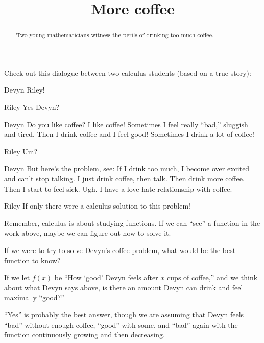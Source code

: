 \documentclass{ximera}
\title[Break-Ground:]{More coffee}
\begin{document}
\begin{abstract}
Two young mathematicians witness the perils of drinking too much
coffee.
\end{abstract}
\maketitle

Check out this dialogue between two calculus students (based on a true
story):

\begin{dialogue}
\item[Devyn] Riley! 
\item[Riley] Yes Devyn?
\item[Devyn] Do you like coffee? I like coffee! Sometimes I feel
  really ``bad,'' sluggish and tired. Then I drink coffee and I feel
  good! Sometimes I drink a lot of coffee!
\item[Riley] Um?
\item[Devyn] But here's the problem, see: If I drink too much, I
  become over excited and can't stop talking. I just drink coffee,
  then talk. Then drink more coffee. Then I start to feel sick. Ugh. I
  have a love-hate relationship with coffee.
\item[Riley] If only there were a calculus solution to this problem!
\end{dialogue}

Remember, calculus is about studying functions. If we can ``see'' a function in the work above, maybe we can figure out how to solve it. 

\begin{problem}
  If we were to try to solve Devyn's coffee problem, what would be the best
  function to know?
  \begin{multipleChoice}
  \end{multipleChoice}
\begin{problem}
  If we let $f(x)$ be ``How `good' Devyn feels after $x$ cups of
  coffee,'' and we think about what Devyn says above, is there an amount Devyn can drink and feel maximally ``good?''
  \begin{multipleChoice}
  \end{multipleChoice}
  \begin{feedback}
    ``Yes'' is probably the best answer, though we are assuming that
    Devyn feels ``bad'' without enough coffee, ``good'' with some, and
    ``bad'' again with the function continuously growing and then
    decreasing.
  \end{feedback}
\end{problem}
\end{problem}





\end{document}
